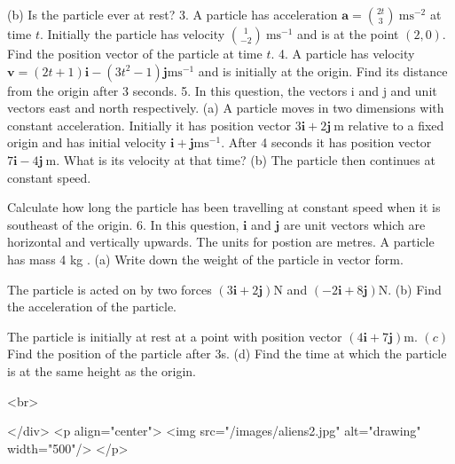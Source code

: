 (b) Is the particle ever at rest?
3. A particle has acceleration $\mathbf{a}=\binom{2 t}{3} \mathrm{~ms}^{-2}$ at time $t$. Initially the particle has velocity $\binom{1}{-2} \mathrm{~ms}^{-1}$ and is at the point $(2,0)$. Find the position vector of the particle at time $t$.
4. A particle has velocity $\mathbf{v}=(2 t+1) \mathbf{i}-\left(3 t^{2}-1\right) \mathbf{j} \mathrm{ms}^{-1}$ and is initially at the origin. Find its distance from the origin after 3 seconds.
5. In this question, the vectors i and j and unit vectors east and north respectively.
(a) A particle moves in two dimensions with constant acceleration. Initially it has position vector $3 \mathbf{i}+2 \mathbf{j} \mathrm{~m}$ relative to a fixed origin and has initial velocity $\mathbf{i}+\mathbf{j} \mathrm{ms}^{-1}$. After 4 seconds it has position vector $7 \mathbf{i}-4 \mathbf{j} \mathrm{~m}$.
What is its velocity at that time?
(b) The particle then continues at constant speed.

Calculate how long the particle has been travelling at constant speed when it is southeast of the origin.
6. In this question, $\mathbf{i}$ and $\mathbf{j}$ are unit vectors which are horizontal and vertically upwards. The units for postion are metres.
A particle has mass 4 kg .
(a) Write down the weight of the particle in vector form.

The particle is acted on by two forces $(3 \mathbf{i}+2 \mathbf{j}) \mathrm{N}$ and $(-2 \mathbf{i}+8 \mathbf{j}) \mathrm{N}$.
(b) Find the acceleration of the particle.

The particle is initially at rest at a point with position vector $(4 \mathbf{i}+7 \mathbf{j}) \mathrm{m}$.
\((c)\) Find the position of the particle after 3s.
(d) Find the time at which the particle is at the same height as the origin.

<br>

</div>
<p align="center">
<img src="/images/aliens2.jpg" alt="drawing" width="500"/>
</p>
